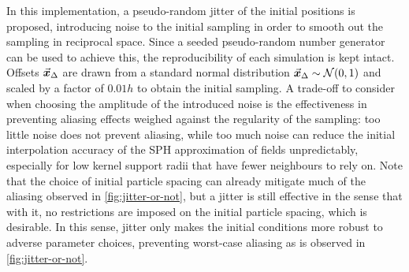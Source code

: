 In this implementation, a pseudo-random jitter of the initial positions is proposed, introducing noise to the initial sampling in order to smooth out the sampling in reciprocal space. Since a seeded pseudo-random number generator can be used to achieve this, the reproducibility of each simulation is kept intact. Offsets $\vec{\bm{x}}_{\Delta}$ are drawn from a standard normal distribution $\vec{\bm{x}}_{\Delta} \sim \mathcal{N}(0, 1)$ and scaled by a factor of $0.01h$ to obtain the initial sampling. A trade-off to consider when choosing the amplitude of the introduced noise is the effectiveness in preventing aliasing effects weighed against the regularity of the sampling: too little noise does not prevent aliasing, while too much noise can reduce the initial interpolation accuracy of the SPH approximation of fields unpredictably, especially for low kernel support radii that have fewer neighbours to rely on. Note that the choice of initial particle spacing can already mitigate much of the aliasing observed in \autoref{fig:jitter-or-not}, but a jitter is still effective in the sense that with it, no restrictions are imposed on the initial particle spacing, which is desirable. In this sense, jitter only makes the initial conditions more robust to adverse parameter choices, preventing worst-case aliasing as is observed in \autoref*{fig:jitter-or-not}.

